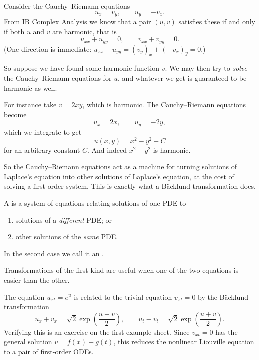 \begin{example}
	Consider the Cauchy--Riemann equations
	$$
	u_x = v_y, \qquad u_y = -v_x.
	$$
	From IB Complex Analysis we know that a pair $(u,v)$ satisfies these if and only if both $u$ and $v$ are harmonic, that is
	$$
	u_{xx} + u_{yy} = 0, \qquad v_{xx}+v_{yy} = 0.
	$$
	(One direction is immediate: $u_{xx} + u_{yy} = (v_y)_x + (-v_x)_y = 0$.)

	So suppose we have found some harmonic function $v$. We may then try to \emph{solve} the Cauchy--Riemann equations for $u$, and whatever we get is guaranteed to be harmonic as well.

	For instance take $v = 2xy$, which is harmonic. The Cauchy--Riemann equations become
	$$
	u_x = 2x, \qquad u_y = -2y,
	$$
	which we integrate to get
	$$
	u(x,y) = x^2 - y^2 + C
	$$
	for an arbitrary constant $C$. And indeed $x^2 - y^2$ is harmonic.

	So the Cauchy--Riemann equations act as a machine for turning solutions of Laplace's equation into other solutions of Laplace's equation, at the cost of solving a first-order system. This is exactly what a B\"acklund transformation does.
\end{example}

\begin{definition}
	A  is a system of equations relating solutions of one PDE to
	\begin{enumerate}[label=(\roman*)]
		\item solutions of a \emph{different} PDE; or
		\item other solutions of the \emph{same} PDE.
	\end{enumerate}
	In the second case we call it an .
\end{definition}

Transformations of the first kind are useful when one of the two equations is easier than the other.

\begin{example}
	The equation $u_{xt} = e^u$ is related to the trivial equation $v_{xt} = 0$ by the B\"acklund transformation
	$$
	u_x + v_x = \sqrt2\exp\left(\frac{u-v}{2}\right), \qquad u_t - v_t = \sqrt2\exp\left(\frac{u+v}{2}\right).
	$$
	Verifying this is an exercise on the first example sheet. Since $v_{xt} = 0$ has the general solution $v = f(x) + g(t)$, this reduces the nonlinear Liouville equation to a pair of first-order ODEs.
\end{example}

